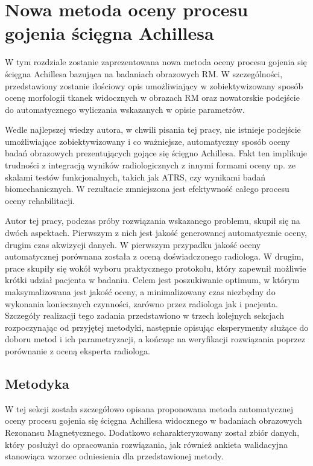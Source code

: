 \chapter{Nowa metoda oceny procesu gojenia ścięgna Achillesa}
\label{NewMethod}

W tym rozdziale zostanie zaprezentowana nowa metoda oceny procesu gojenia się ścięgna Achillesa bazująca na badaniach obrazowych RM. W szczególności, przedstawiony zostanie ilościowy opis umożliwiający w zobiektywizowany sposób ocenę morfologii tkanek widocznych w obrazach RM oraz nowatorskie podejście do automatycznego wyliczania wskazanych w opisie parametrów. 

Wedle najlepszej wiedzy autora, w chwili pisania tej pracy, nie istnieje podejście umożliwiające zobiektywizowany i co ważniejsze, automatyczny sposób oceny badań obrazowych prezentujących gojące się ścięgno Achillesa. Fakt ten implikuje trudności z integracją wyników radiologicznych z innymi formami oceny np. ze skalami testów funkcjonalnych, takich jak ATRS, czy wynikami badań biomechanicznych. W rezultacie zmniejszona jest efektywność całego procesu oceny rehabilitacji. 

Autor tej pracy, podczas próby rozwiązania wskazanego problemu, skupił się na dwóch aspektach. Pierwszym z nich jest jakość generowanej automatycznie oceny, drugim czas akwizycji danych. W pierwszym przypadku jakość oceny automatycznej porównana została z oceną doświadczonego radiologa. W drugim, prace skupiły się wokół wyboru praktycznego protokołu, który zapewnił możliwie krótki udział pacjenta w badaniu. Celem jest poszukiwanie optimum, w którym maksymalizowana jest jakość oceny, a minimalizowany czas niezbędny do wykonania koniecznych czynności, zarówno przez radiologa jak i pacjenta. Szczegóły realizacji tego zadania przedstawiono w trzech kolejnych sekcjach rozpoczynając od przyjętej metodyki, następnie opisując eksperymenty służące do doboru metod i ich parametryzacji, a kończąc na weryfikacji rozwiązania poprzez porównanie z oceną eksperta radiologa.

\section{Metodyka}
\label{seq:method}
W tej sekcji została szczegółowo opisana proponowana metoda automatycznej oceny procesu gojenia się ścięgna Achillesa widocznego w badaniach obrazowych Rezonansu Magnetycznego. Dodatkowo scharakteryzowany został zbiór danych, który posłużył do opracowania rozwiązania, jak również ankieta walidacyjna stanowiąca wzorzec odniesienia dla przedstawionej metody. 

